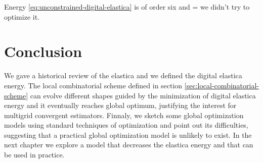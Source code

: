 Energy \eqref{eq:unconstrained-digital-elastica} is of order six and = we didn't try to optimize it.

\section{Conclusion}
We gave a historical review of the elastica and we defined the digital elastica energy. The local combinatorial scheme defined in section \ref{sec:local-combinatorial-scheme} can evolve different shapes guided by the minimization of digital elastica energy and it eventually reaches global optimum, justifying the interest for multigrid convergent estimators. Finnaly, we sketch some global optimization models using standard techniques of optimization and point out its difficulties, suggesting that a practical global optimization model is unlikely to exist. In the next chapter we explore a model that decreases the elastica energy and that can be used in practice.

